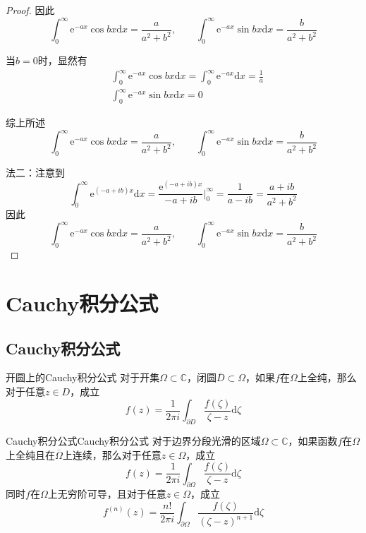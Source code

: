 \documentclass[lang = cn, scheme = chinese, thmcnt = section]{elegantbook}
\newcommand{\C}{\mathbb{C}}  		   %
\newcommand{\sub}{\subset}             %
\begin{document}
\begin{proof}
	因此
	$$
	\int_0^{\infty}{\mathrm{e}^{-ax}\cos{bx}\mathrm{d}x}=\frac{a}{a^2+b^2},\qquad 
	\int_0^{\infty}{\mathrm{e}^{-ax}\sin{bx}\mathrm{d}x}=\frac{b}{a^2+b^2}
	$$
	
	当$b=0$时，显然有
	\begin{align*}
		& \int_0^{\infty}{\mathrm{e}^{-ax}\cos{bx}\mathrm{d}x}=
		\int_0^{\infty}{\mathrm{e}^{-ax}\mathrm{d}x}=\frac{1}{a}\\
		& \int_0^{\infty}{\mathrm{e}^{-ax}\sin{bx}\mathrm{d}x}=0
	\end{align*}
	
	综上所述
	$$
	\int_0^{\infty}{\mathrm{e}^{-ax}\cos{bx}\mathrm{d}x}=\frac{a}{a^2+b^2},\qquad 
	\int_0^{\infty}{\mathrm{e}^{-ax}\sin{bx}\mathrm{d}x}=\frac{b}{a^2+b^2}
	$$
	
	法二：注意到
	$$
	\int_0^\infty\mathrm{e}^{(-a+ib)x}\mathrm{d}x=\frac{\mathrm{e}^{(-a+ib)x}}{-a+ib}\Big|_{0}^\infty=\frac{1}{a-ib}=\frac{a+ib}{a^2+b^2}
	$$
	因此
	$$
	\int_0^{\infty}{\mathrm{e}^{-ax}\cos{bx}\mathrm{d}x}=\frac{a}{a^2+b^2},\qquad 
	\int_0^{\infty}{\mathrm{e}^{-ax}\sin{bx}\mathrm{d}x}=\frac{b}{a^2+b^2}
	$$
\end{proof}

\section{Cauchy积分公式}

\subsection{Cauchy积分公式}

\begin{theorem}{开圆上的Cauchy积分公式}
	对于开集$\Omega\sub\C$，闭圆$\overline{D}\sub\Omega$，如果$f$在$\Omega$上全纯，那么对于任意$z\in D$，成立%
	$$
	f(z)=\frac{1}{2\pi i}\int_{\partial D}{\frac{f(\zeta)}{\zeta-z}\mathrm{d}\zeta}
	$$
\end{theorem}

\begin{theorem}{Cauchy积分公式}{Cauchy积分公式}
	对于边界分段光滑的区域$\Omega\sub\C$，如果函数$f$在$\Omega$上全纯且在$\overline{\Omega}$上连续，那么对于任意$z\in\Omega$，成立
	$$
	f(z)=\frac{1}{2\pi i}\int_{\partial \Omega}{\frac{f(\zeta)}{\zeta-z}\mathrm{d}\zeta}
	$$
	同时$f$在$\Omega$上无穷阶可导，且对于任意$z\in\Omega$，成立
	$$
	f^{(n)}(z)=\frac{n!}{2\pi i}\int_{\partial\Omega}{\frac{f(\zeta)}{(\zeta-z)^{n+1}}\mathrm{d}\zeta}
	$$
\end{theorem}
\end{document}
